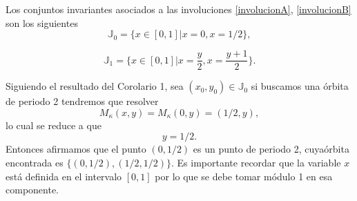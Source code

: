 Los conjuntos invariantes asociados a las involuciones \eqref{involucionA}, \eqref{involucionB} son los siguientes
\begin{equation}
\mathbb{J}_{0} = \{ x \in [0,1] |x=0, x=1/2\},
\label{invariantejA}
\end{equation}

\begin{equation}
\mathbb{J}_{1} = \{ x \in [0,1] |x=\frac{y}{2}, x=\frac{y+1}{2}\}.
\label{invariantejB}
\end{equation}

Siguiendo el resultado del Corolario 1, sea $(x_{0},y_{0})\in \mathbb{J}_{0}$ si buscamos una \'orbita de periodo 2 tendremos que resolver 
\begin{equation*}
M_{\kappa}(x,y) = M_{\kappa}(0,y)=(1/2,y),
\end{equation*}
lo cual se reduce a que
\begin{equation*}
y=1/2.
\end{equation*}
Entonces afirmamos que el punto $(0,1/2)$ es un punto de periodo 2, cuya\'orbita encontrada es $\{(0,1/2), (1/2,1/2)\}$. Es importante recordar que la variable $x$ est\'a definida en el intervalo $[0,1]$ por lo que se debe tomar m\'odulo 1 en esa componente. \\

